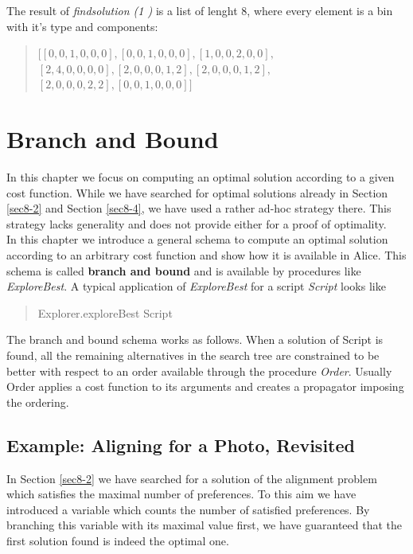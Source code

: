 \documentclass[a4paper]{scrartcl}
\begin{document}
\par 
The result of {\it findsolution (1 )}
is a list of lenght 8, where every element is a bin with it's type
and components:
\begin{quote}
$[[0, 0, 1, 0, 0, 0], [0, 0, 1, 0, 0, 0], [1, 0, 0, 2, 0, 0],$\\
$[2, 4, 0, 0, 0, 0], [2, 0, 0, 0, 1, 2], [2, 0, 0, 0, 1, 2],$\\
$[2, 0, 0, 0, 2, 2], [0, 0, 1, 0, 0, 0]]$
\end{quote}






\newpage
\section{Branch and Bound}
In this chapter we focus on computing an optimal solution 
according to a given cost function. While we have searched 
for optimal solutions already in Section \ref{sec8-2} and Section 
\ref{sec8-4}, we have used a rather ad-hoc strategy there. This strategy 
lacks generality and does not provide either for a proof of optimality.\\

In this chapter we introduce a general schema to compute an optimal 
solution according to an arbitrary cost function and show how it is 
available in Alice. This schema is called {\bf branch and bound} and is available 
by procedures like {\it ExploreBest}. A typical application of {\it ExploreBest}
for a script {\it Script} looks like
\begin{quote}
    Explorer.exploreBest Script 
\end{quote}
The branch and bound schema works as follows. When a solution of 
Script is found, all the remaining alternatives in the search tree 
are constrained to be better with respect to an order available through 
the procedure {\it Order}. Usually Order applies a cost function to its 
arguments and creates a propagator imposing the ordering.  




\subsection{Example: Aligning for a Photo, Revisited}
In Section \ref{sec8-2} we have searched for a solution of the 
alignment problem which satisfies the maximal number of preferences. 
To this aim we have introduced a variable which counts the number of 
satisfied preferences. By branching this variable with its maximal 
value first, we have guaranteed that the first solution found is 
indeed the optimal one.\\
\end{document}
